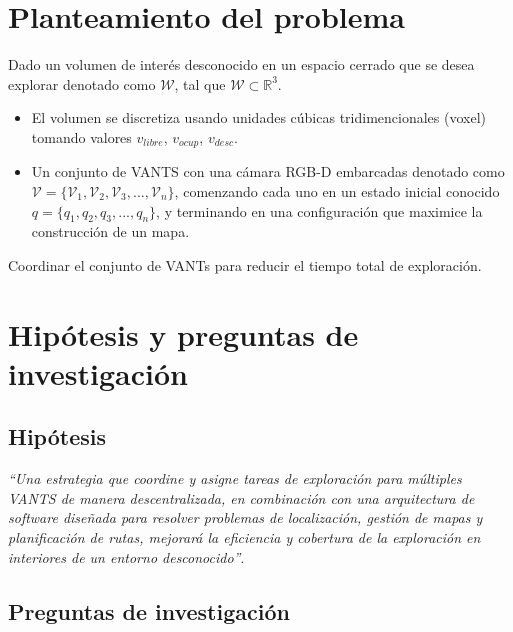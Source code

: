 \section{Planteamiento del problema} 

Dado un volumen de interés desconocido en un espacio cerrado que se desea explorar denotado como $\mathcal{W}$, tal que $\mathcal{W} \subset \mathbb{R}^{3}$.
\begin{itemize}\setlength{\itemsep}{-1mm}
  \item El volumen se discretiza usando unidades cúbicas tridimencionales (voxel) tomando valores $v_{libre}$, $v_{ocup}$, $v_{desc}$.
  \item Un conjunto de VANTS con una cámara RGB-D embarcadas denotado como $\mathcal{V} = \{\mathcal{V}_{1},\mathcal{V}_{2},\mathcal{V}_{3},...,\mathcal{V}_{n}\}$, comenzando cada uno en un estado inicial conocido $q = \{q_{1},q_{2},q_{3},...,q_{n}\}$, y terminando en una configuración que maximice la construcción de un mapa.
\end{itemize}

Coordinar el conjunto de VANTs para reducir el tiempo total de exploración.
  
  
\section{Hipótesis y preguntas de investigación}

\subsection*{Hipótesis}
\emph{``Una estrategia que coordine y asigne tareas de exploración para múltiples VANTS de manera descentralizada, en combinación con una arquitectura de software diseñada para resolver problemas de localización, gestión de mapas y planificación de rutas, mejorará la eficiencia y cobertura de la exploración en interiores de un entorno desconocido''}.


\subsection*{Preguntas de investigación}

